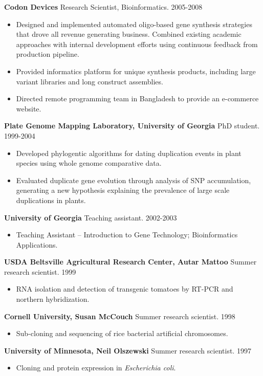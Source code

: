 \documentclass[10pt]{article}
\begin{document}
\textbf{Codon Devices} Research Scientist, Bioinformatics. 2005-2008
\begin{itemize}
  \item Designed and implemented automated oligo-based gene synthesis
  strategies that drove all revenue generating business. Combined
  existing academic approaches with internal development efforts using
  continuous feedback from production pipeline.
  \item Provided informatics platform for unique synthesis products, including
  large variant libraries and long construct assemblies.
  \item Directed remote programming team in Bangladesh
    to provide an e-commerce website.
\end{itemize}

\textbf{Plate Genome Mapping Laboratory, University of Georgia} PhD student. 1999-2004
\begin{itemize}
  \item Developed phylogentic algorithms for dating duplication events
  in plant species using whole genome comparative data.
  \item Evaluated duplicate gene evolution through analysis of SNP
  accumulation, generating a new hypothesis explaining the prevalence of
  large scale duplications in plants.
\end{itemize}

\textbf{University of Georgia} Teaching assistant. 2002-2003
\begin{itemize}
  \item[] Teaching Assistant -- Introduction to Gene Technology; Bioinformatics Applications.
\end{itemize}

\textbf{USDA Beltsville Agricultural Research Center, Autar Mattoo} Summer research scientist. 1999
\begin{itemize}
  \item[] RNA isolation and detection of transgenic tomatoes by RT-PCR and
  northern hybridization.
\end{itemize}

\textbf{Cornell University, Susan McCouch} Summer research scientist. 1998
\begin{itemize}
  \item[] Sub-cloning and sequencing of rice bacterial artificial chromosomes.
\end{itemize}

\textbf{University of Minnesota, Neil Olszewski} Summer research scientist. 1997
\begin{itemize}
  \item[] Cloning and protein expression in \textit{Escherichia coli}.
\end{itemize}
\end{document}
